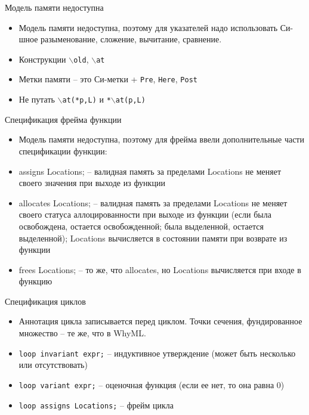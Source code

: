 \documentclass[hyperref={unicode=true}]{beamer}
\begin{document}
    \begin{frame}{Модель памяти недоступна}
    \begin{itemize}
    \item
    Модель памяти недоступна, поэтому для указателей
    надо использовать Си-шное разыменование, сложение, вычитание,
    сравнение.
    \item
    Конструкции \texttt{$\backslash$old}, \texttt{$\backslash$at}
    \item
    Метки памяти -- это Си-метки + \texttt{Pre}, \texttt{Here}, \texttt{Post}
    \item
    Не путать \texttt{$\backslash$at(*p,L)} и \texttt{*$\backslash$at(p,L)}
    \end{itemize}
    \end{frame}

    \begin{frame}{Спецификация фрейма функции}
    \begin{itemize}
    \item
    Модель памяти недоступна, поэтому для фрейма ввели
    дополнительные части спецификации функции:
    \item
    assigns Locations; -- валидная память за пределами Locations
    не меняет своего значения при выходе из функции
    \item
    allocates Locations; -- валидная память за пределами Locations
    не меняет своего статуса аллоцированности при выходе из функции
    (если была освобождена, остается освобожденной; была выделенной,
     остается выделенной); Locations вычисляется в состоянии памяти
    при возврате из функции
    \item
    frees Locations; -- то же, что allocates, но Locations
    вычисляется при входе в функцию
    \end{itemize}
    \end{frame}

    \begin{frame}{Спецификация циклов}
    \begin{itemize}
    \item
    Аннотация цикла записывается перед циклом. Точки сечения,
    фундированное множество -- те же, что в WhyML.
    \item
    \texttt{loop invariant expr;} -- индуктивное утверждение
    (может быть несколько или отсутствовать)
    \item
    \texttt{loop variant expr;} -- оценочная функция
    (если ее нет, то она равна 0)
    \item
    \texttt{loop assigns Locations;} -- фрейм цикла
    \end{itemize}
    \end{frame}
\end{document}
